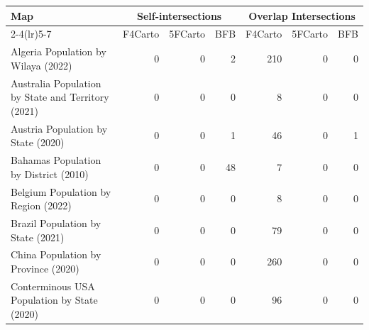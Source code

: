 
\begin{tabular}{lrrr|rrr}
\toprule
\multirow{2}{*}{Map} & \multicolumn{3}{c}{Self-intersections} & \multicolumn{3}{c}{Overlap Intersections} \\
\cmidrule(lr){2-4}\cmidrule(lr){5-7}
                   & F4Carto & 5FCarto & BFB & F4Carto & 5FCarto & BFB \\
\midrule

                      Algeria Population by Wilaya (2022) &                           0 &                           0 &                              2 &                            210 &                              0 &                                 0 \\
       Australia Population by State and Territory (2021) &                           0 &                           0 &                              0 &                              8 &                              0 &                                 0 \\
                       Austria Population by State (2020) &                           0 &                           0 &                              1 &                             46 &                              0 &                                 1 \\
                    Bahamas Population by District (2010) &                           0 &                           0 &                             48 &                              7 &                              0 &                                 0 \\
                      Belgium Population by Region (2022) &                           0 &                           0 &                              0 &                              8 &                              0 &                                 0 \\
                        Brazil Population by State (2021) &                           0 &                           0 &                              0 &                             79 &                              0 &                                 0 \\
                      China Population by Province (2020) &                           0 &                           0 &                              0 &                            260 &                              0 &                                 0 \\
              Conterminous USA Population by State (2020) &                           0 &                           0 &                              0 &                             96 &                              0 &                                 0 \\

\end{tabular}
